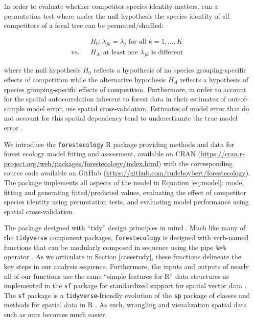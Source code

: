 \documentclass[12pt]{article}
\begin{document}
In order to evaluate whether competitor species identity matters,
\citet{allen_permutation_2020} run a permutation test where under the
null hypothesis the species identity of all competitors of a focal tree
can be permuted/shuffled:

\begin{eqnarray}
\label{eq:permutation-hypothesis-test}
&&H_0: \lambda_{jk} = \lambda_{j} \mbox{ for all } k = 1, \ldots, K\\
\text{vs.}&&H_A: \text{at least one } \lambda_{jk} \mbox{ is different}
\end{eqnarray}

where the null hypothesis \(H_0\) reflects a hypothesis of no species
grouping-specific effects of competition while the alternative
hypothesis \(H_A\) reflects a hypothesis of species grouping-specific
effects of competition. Furthermore, in order to account for the spatial
autocorrelation inherent to forest data in their estimates of
out-of-sample model error, \citet{allen_permutation_2020} use spatial
cross-validation. Estimates of model error that do not account for this
spatial dependency tend to underestiamte the true model error
\citep{roberts_cross-validation_2017}.

We introduce the \texttt{forestecology} R package providing methods and
data for forest ecology model fitting and assessment, available on CRAN
(\url{https://cran.r-project.org/web/packages/forestecology/index.html})
with the corresponding source code available on GitHub
(\url{https://github.com/rudeboybert/forestecology}). The package
implements all aspects of the model in Equation \ref{eq:model}: model
fitting and generating fitted/predicted values, evaluating the effect of
competitor species identity using permutation tests, and evaluating
model performance using spatial cross-validation.

The package designed with ``tidy'' design principles in mind
\citep{wickham_welcome_2019}. Much like many of the \texttt{tidyverse}
component packages, \texttt{forestecology} is designed with verb-named
functions that can be modularly composed in sequence using the pipe
\texttt{\%\textgreater{}\%} operator \citep{bache_pipe_2020}. As we
articulate in Section \ref{casestudy}, these functions delineate the key
steps in our analysis sequence. Furthermore, the inputs and outputs of
nearly all of our functions use the same ``simple features for R'' data
structures as implemented in the \texttt{sf} package for standardized
support for spatial vector data \citep{pebesma_simple_2018}. The
\texttt{sf} package is a \texttt{tidyverse}-friendly evolution of the
\texttt{sp} package of classes and methods for spatial data in R
\citep{pebesma_sp_2005}. As such, wrangling and visualization spatial
data such as ours becomes much easier.
\end{document}
